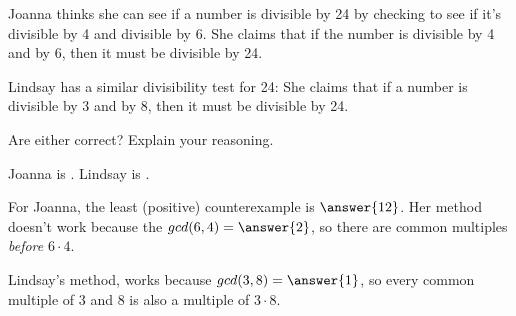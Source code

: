 \documentclass[nooutcomes]{ximera}
\begin{document}
\begin{problem}
Joanna thinks she can see if a number is divisible by 24 by
  checking to see if it's divisible by 4 and divisible by 6.  She
  claims that if the number is divisible by 4 and by 6, then it must
  be divisible by 24.

Lindsay has a similar divisibility test for 24: She claims that if a
number is divisible by 3 and by 8, then it must be divisible by 24.

Are either correct?  Explain your reasoning.

Joanna is .  
Lindsay is .  
\begin{freeResponse}
\begin{hint}For Joanna, the least (positive) counterexample is $\answer{12}$.  Her method doesn't work because the $gcd(6,4) = \answer{2}$, so there are common multiples \emph{before} $6\cdot4$.  

Lindsay's method, works because $gcd(3,8) = \answer{1}$, so every common multiple of $3$ and $8$ is also a multiple of $3\cdot8$.  
\end{hint}
\end{freeResponse}
\end{problem}


\end{document}
